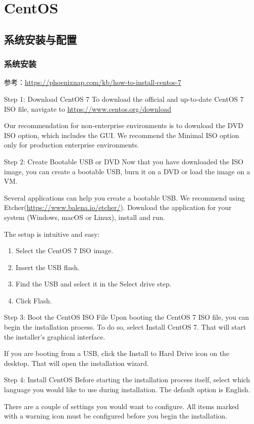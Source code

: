 {\part{CentOS}
\chapter{系统安装与配置}
\section{系统安装}
参考：\url{https://phoenixnap.com/kb/how-to-install-centos-7}

Step 1: Download CentOS 7
To download the official and up-to-date CentOS 7 ISO file, navigate to \url{https://www.centos.org/download}

Our recommendation for non-enterprise environments is to download the DVD ISO option, which includes the GUI. We recommend the Minimal ISO option only for production enterprise environments.


Step 2: Create Bootable USB or DVD
Now that you have downloaded the ISO image, you can create a bootable USB, burn it on a DVD or load the image on a VM.

Several applications can help you create a bootable USB. We recommend using Etcher(\url{https://www.balena.io/etcher/}). Download the application for your system (Windows, macOS or Linux), install and run.

The setup is intuitive and easy:
\begin{enumerate}
\item Select the CentOS 7 ISO image.
\item Insert the USB flash.
\item Find the USB and select it in the Select drive step.
\item Click Flash.
\end{enumerate}


Step 3: Boot the CentOS ISO File
Upon booting the CentOS 7 ISO file, you can begin the installation process. To do so, select Install CentOS 7. That will start the installer’s graphical interface.

If you are booting from a USB, click the Install to Hard Drive icon on the desktop. That will open the installation wizard.


Step 4: Install CentOS
Before starting the installation process itself, select which language you would like to use during installation. The default option is English.


There are a couple of settings you would want to configure. All items marked with a warning icon must be configured before you begin the installation.

}
